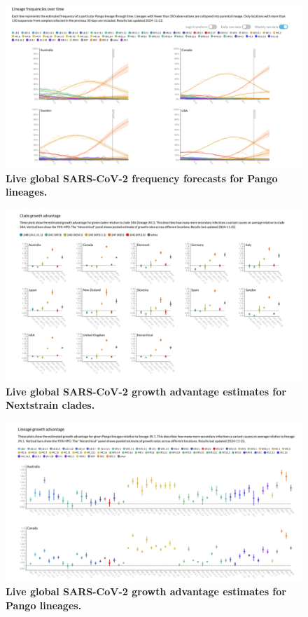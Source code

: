 \begin{figure}[h]
    \centering
    \includegraphics[width=1.0\linewidth]{./figures/lineage_frequencies.png}
    \caption{
      \textbf{Live global SARS-CoV-2 frequency forecasts for Pango lineages.}
    }
    \label{fig:fn_lineage_frequencies}
\end{figure}


\begin{figure}[h]
    \centering
    \includegraphics[width=1.0\linewidth]{./figures/clade_growth_advantages.png}
    \caption{
      \textbf{Live global SARS-CoV-2 growth advantage estimates for Nextstrain clades.}
    }
    \label{fig:fn_clade_growth_advantages}
\end{figure}


\begin{figure}[h]
    \centering
    \includegraphics[width=1.0\linewidth]{./figures/lineage_growth_advantages.png}
    \caption{
      \textbf{Live global SARS-CoV-2 growth advantage estimates for Pango lineages.}
    }
    \label{fig:fn_lineage_growth_advantages}
\end{figure}
